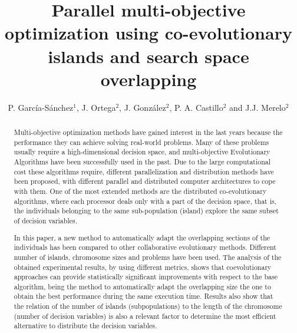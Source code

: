 \documentclass[preprint]{elsarticle}
\begin{document}
\begin{frontmatter}


\title{Parallel multi-objective optimization using co-evolutionary
  islands and search space overlapping}


\author{P. Garc\'ia-S\'anchez$^1$, J. Ortega$^2$, J. Gonz\'alez$^2$, P. A. Castillo$^2$ and J.J. Merelo$^2$}
\address{
$^1$ Department of Computer Science and Engineering. ESI. University of C\'adiz, Spain\\
$^2$ Department of Computer Architecture and Computer Technology.\\ ETSIIT - CITIC. University of Granada, Spain\\
}


\begin{abstract}
Multi-objective optimization methods have gained interest in the last
years because the performance they can achieve solving real-world
problems. 
Many of these problems usually require a high-dimensional
decision space, and multi-objective Evolutionary Algorithms have been
successfully used in the past. 
Due to the large computational cost
these algorithms require, different parallelization and distribution
methods have been proposed, with different parallel and distributed
computer architectures to cope with them. One of the most extended
methods are the distributed co-evolutionary algorithms, where each
processor deals only with a part of the decision space, that is, the
individuals belonging to the same sub-population (island) explore the
same subset of decision variables.

In this paper, a new method to automatically adapt the overlapping
sections of the individuals has been compared to other collaborative
evolutionary methods. 
Different number of islands, chromosome sizes and problems have been
used. The analysis of the obtained experimental results, by using
different  
metrics, shows that coevolutionary approaches can provide
statistically significant improvements with respect to the base
algorithm, being the method to automatically adapt the overlapping
size the one to obtain the best performance during the same execution
time. Results also show that the relation of the number of  
islands (subpopulations) to the length of the chromosome (number of
decision variables) is also a relevant factor to determine the most
efficient alternative to distribute the decision variables.
\end{abstract}



\end{frontmatter}
\end{document}
